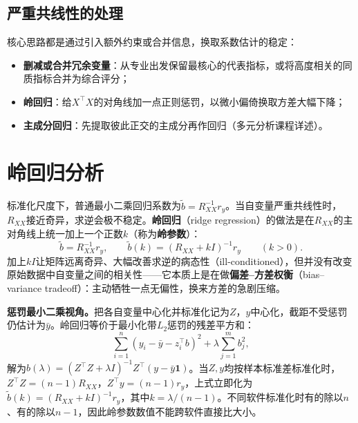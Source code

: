 \subsection{严重共线性的处理}
核心思路都是通过引入额外约束或合并信息，换取系数估计的稳定：
\begin{itemize}
\item \textbf{删减或合并冗余变量}：从专业出发保留最核心的代表指标，或将高度相关的同质指标合并为综合评分；
\item \textbf{岭回归}：给$X^\top X$的对角线加一点正则惩罚，以微小偏倚换取方差大幅下降；
\item \textbf{主成分回归}：先提取彼此正交的主成分再作回归（多元分析课程详述）。
\end{itemize}

\section{岭回归分析}\label{sec:ridge}
标准化尺度下，普通最小二乘回归系数为$\widetilde b=R_{XX}^{-1}r_y$。当自变量严重共线性时，$R_{XX}$接近奇异，求逆会极不稳定。\textbf{岭回归}（ridge regression）的做法是在$R_{XX}$的主对角线上统一加上一个正数$k$（称为\textbf{岭参数}）：
\[
\widetilde b=R_{XX}^{-1}r_y,\qquad
\widetilde b(k)=(R_{XX}+kI)^{-1}r_y\qquad (k>0).
\]
加上$kI$让矩阵远离奇异、大幅改善求逆的病态性（ill-conditioned），但并没有改变原始数据中自变量之间的相关性——它本质上是在做\textbf{偏差--方差权衡}（bias--variance tradeoff）：主动牺牲一点无偏性，换来方差的急剧压缩。

\textbf{惩罚最小二乘视角。}把各自变量中心化并标准化记为$Z$，$y$中心化，截距不受惩罚仍估计为$\bar y$。岭回归等价于最小化带$L_2$惩罚的残差平方和：
\[
\sum_{i=1}^n(y_i-\bar y-z_i^\top b)^2+\lambda\sum_{j=1}^mb_j^2,
\]
解为$\widehat b(\lambda)=(Z^\top Z+\lambda I)^{-1}Z^\top(y-\bar y\mathbf 1)$。当$Z,y$均按样本标准差标准化时，$Z^\top Z=(n-1)R_{XX}$，$Z^\top y=(n-1)r_y$，上式立即化为$\widetilde b(k)=(R_{XX}+kI)^{-1}r_y$，其中$k=\lambda/(n-1)$。不同软件标准化时有的除以$n$、有的除以$n-1$，因此岭参数数值不能跨软件直接比大小。

